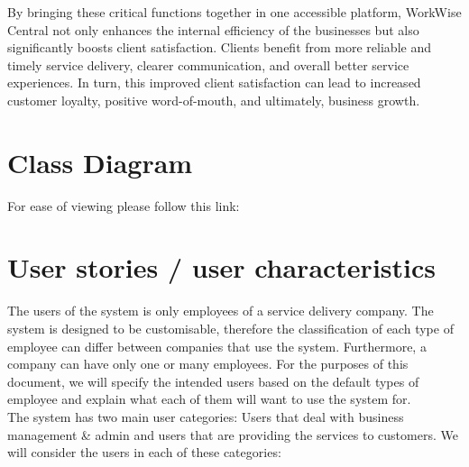 \documentclass{article}
\begin{document}
	By bringing these critical functions together in one accessible platform, WorkWise Central not only enhances the internal efficiency of the businesses but also significantly boosts client satisfaction. Clients benefit from more reliable and timely service delivery, clearer communication, and overall better service experiences. In turn, this improved client satisfaction can lead to increased customer loyalty, positive word-of-mouth, and ultimately, business growth.\\
	
	\newpage
	
	\section*{Class Diagram}	
	For ease of viewing please follow this link: 
	
	\newpage
	
	\section*{User stories / user characteristics}
	The users of the system is only employees of a service delivery company. The system is designed to be customisable, therefore the classification of each type of employee can differ between companies that use the system. Furthermore, a company can have only one or many employees. For the purposes of this document, we will specify the intended users based on the default types of employee and explain what each of them will want to use the system for. \\
	
	The system has two main user categories: Users that deal with business management \& admin and users that are providing the services to customers. We will consider the users in each of these categories:
	
\end{document}
